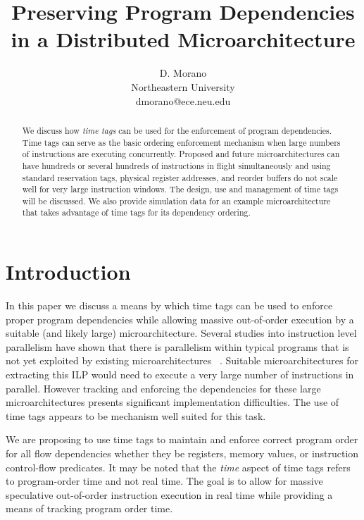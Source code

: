 \documentclass[10pt,dvips]{article}
\begin{document}
%
%
\title{Preserving Program Dependencies in a Distributed Microarchitecture}
%
%
\author{
D. Morano\\
Northeastern University\\
dmorano@ece.neu.edu
}
%
%
\date{}
%
\maketitle
%
%
%
\begin{abstract}
We discuss how {\em time tags} can be used for the enforcement of
program dependencies.
Time tags can serve as the basic ordering enforcement mechanism
when large numbers of instructions are executing concurrently.
Proposed and future microarchitectures can have hundreds or several hundreds
of instructions in flight simultaneously and using standard 
reservation
tags, physical register addresses, and reorder buffers do not scale
well for very large instruction windows.
The design, use and management of time tags will
be discussed.  
We also provide simulation data for an example microarchitecture
that takes advantage of time tags for its dependency ordering.
\end{abstract}
%
%
\section{Introduction}
%
In this paper we discuss a means by which time tags can be used
to enforce proper program dependencies while allowing
massive out-of-order execution by a suitable (and likely large)
microarchitecture.
Several studies into instruction level parallelism
have shown that there is parallelism within
typical programs that is not yet exploited by existing
microarchitectures ~\cite{Gon97,Lam92,Uht95}.  
Suitable microarchitectures for extracting this ILP would need to
execute a very large number of instructions in parallel.
However tracking and enforcing the dependencies for these
large microarchitectures presents significant implementation
difficulties.  The use of time tags appears to be mechanism well suited
for this task.

We are proposing to use time tags to maintain 
and enforce correct program order for all flow dependencies whether
they be registers, memory values, or instruction control-flow predicates.
It may be noted that the \textit{time} aspect of time tags
refers to program-order time and not real time.
The goal is to allow for massive speculative out-of-order 
instruction execution
in real time while providing a means of tracking program order
time.
\end{document}
